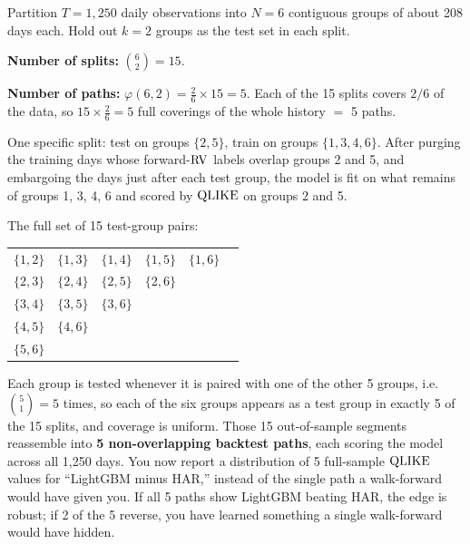 \begin{workedexample}[CPCV with $N = 6$, $k = 2$]
Partition $T = 1{,}250$ daily observations into $N = 6$ contiguous groups of about 208 days each.
Hold out $k = 2$ groups as the test set in each split.

\textbf{Number of splits:} $\binom{6}{2} = 15$.

\textbf{Number of paths:} $\varphi(6,2) = \frac{2}{6} \times 15 = 5$.
Each of the 15 splits covers $2/6$ of the data, so $15 \times \frac{2}{6} = 5$ full coverings of the whole history $=$ 5 paths.

One specific split: test on groups $\{2,5\}$, train on groups $\{1,3,4,6\}$.
After purging the training days whose forward-$\operatorname{RV}$ labels overlap groups 2 and 5, and embargoing the days just after each test group, the model is fit on what remains of groups 1, 3, 4, 6 and scored by $\operatorname{QLIKE}$ on groups 2 and 5.

The full set of 15 test-group pairs:
\begin{center}
\begin{tabular}{cccccc}
\toprule
$\{1,2\}$ & $\{1,3\}$ & $\{1,4\}$ & $\{1,5\}$ & $\{1,6\}$ & \\
$\{2,3\}$ & $\{2,4\}$ & $\{2,5\}$ & $\{2,6\}$ & & \\
$\{3,4\}$ & $\{3,5\}$ & $\{3,6\}$ & & & \\
$\{4,5\}$ & $\{4,6\}$ & & & & \\
$\{5,6\}$ & & & & & \\
\bottomrule
\end{tabular}
\end{center}

Each group is tested whenever it is paired with one of the other 5 groups, i.e.\ $\binom{5}{1} = 5$ times, so each of the six groups appears as a test group in exactly 5 of the 15 splits, and coverage is uniform.
Those 15 out-of-sample segments reassemble into \textbf{5 non-overlapping backtest paths}, each scoring the model across all 1,250 days.
You now report a distribution of 5 full-sample $\operatorname{QLIKE}$ values for ``LightGBM minus HAR,'' instead of the single path a walk-forward would have given you.
If all 5 paths show LightGBM beating HAR, the edge is robust; if 2 of the 5 reverse, you have learned something a single walk-forward would have hidden.
\end{workedexample}


